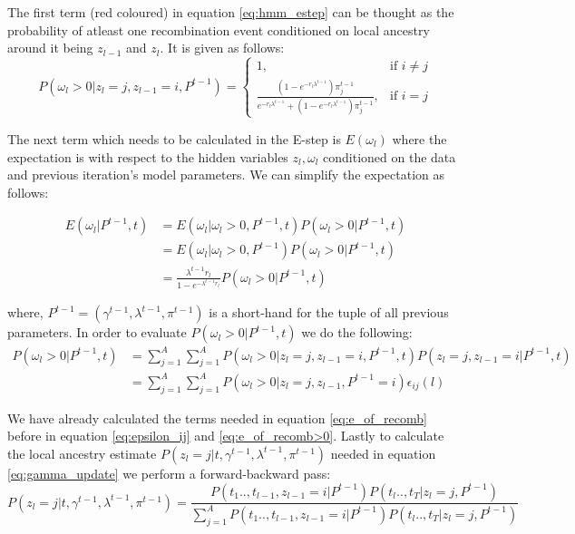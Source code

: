The first term (red coloured) in equation \ref{eq:hmm_estep} can be thought as the probability of atleast one recombination event conditioned on local ancestry around it being $z_{l-1}$ and $z_l$. It is given as follows:
\begin{equation}
  P(\omega_l > 0 \vert z_l = j, z_{l-1} = i, P^{t-1}) = \begin{cases} 1, & \text{if } i \neq j \\ \frac{(1 - e^{-r_l \lambda^{t-1}})\pi_j^{t-1}}{e^{-r_l \lambda^{t-1}} + (1 - e^{-r_l \lambda^{t-1}})\pi_j^{t-1}} , & \text{if } i = j \end{cases}
\label{eq:e_of_recomb>0}
\end{equation}

The next term which needs to be calculated in the E-step is $E(\omega_l)$ where the expectation is with respect to the hidden variables $z_l, \omega_l$ conditioned on the data and previous iteration's model parameters. We can simplify the expectation as follows:

\begin{align}
    E(\omega_l \vert P^{t-1}, t) &= E(\omega_l \vert \omega_l > 0, P^{t-1}, t) P( \omega_l > 0 \vert P^{t-1}, t) \nonumber \\
    &= E(\omega_l \vert \omega_l > 0, P^{t-1}) P( \omega_l > 0 \vert P^{t-1}, t) \nonumber \\
    &= \frac{\lambda^{t-1}r_l}{1 - e^{-\lambda^{t-1}r_l}} P( \omega_l > 0 \vert P^{t-1}, t)
\label{eq:estep_121}
\end{align}

where, $P^{t-1} = (\gamma^{t-1}, \lambda^{t-1}, \pi^{t-1})$ is a short-hand for the tuple of all previous parameters. In order to evaluate $ P( \omega_l > 0 \vert P^{t-1}, t)$ we do the following: 
\begin{align}
  P( \omega_l > 0 \vert P^{t-1}, t) &= \sum\limits_{j=1}^{A}\sum\limits_{j=1}^{A}  P( \omega_l > 0 \vert z_l = j, z_{l-1} = i, P^{t-1}, t) P(z_l = j, z_{l-1} = i \vert P^{t-1}, t) \nonumber \\
  &= \sum\limits_{j=1}^{A}\sum\limits_{j=1}^{A}  P( \omega_l > 0 \vert z_l = j, z_{l-1},  P^{t-1} = i) \epsilon_{ij}(l)
\label{eq:e_of_recomb}
\end{align}

We have already calculated the terms needed in equation \ref{eq:e_of_recomb} before in equation \ref{eq:epsilon_ij} and \ref{eq:e_of_recomb>0}. Lastly to calculate the local ancestry estimate $P(z_l = j | t, \gamma^{t-1}, \lambda^{t-1}, \pi^{t-1})$ needed in equation \ref{eq:gamma_update} we perform a forward-backward pass:
\begin{equation}
    P(z_l = j | t, \gamma^{t-1}, \lambda^{t-1}, \pi^{t-1}) = \frac{P(t_1 .., t_{l-1}, z_{l-1}=i \vert P^{t-1})P(t_{l} .., t_T \vert z_l=j, P^{t-1})}{\sum\limits_{j=1}^{A}P(t_1 .., t_{l-1}, z_{l-1}=i \vert P^{t-1})P(t_{l} .., t_T \vert z_l=j, P^{t-1})}
\end{equation}

